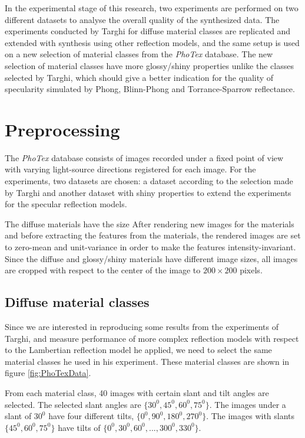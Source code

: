 \hypertarget{experiments}{
}

In the experimental stage of this research, two experiments are performed on two different datasets to analyse the overall quality of the synthesized data. The experiments conducted by Targhi for diffuse material classes are replicated and extended with synthesis using other reflection models, and the same setup is used on a new selection of material classes from the {\it PhoTex} database. The new selection of material classes have more glossy/shiny properties unlike the classes selected by Targhi, which should give a better indication for the quality of specularity simulated by Phong, Blinn-Phong and Torrance-Sparrow reflectance. 

\section{Preprocessing}\label{sec:preprocessing}
The {\it PhoTex} database consists of images recorded under a fixed point of view with varying light-source directions registered for each image. For the experiments, two datasets are chosen: a dataset according to the selection made by Targhi and another dataset with shiny properties to extend the experiments for the specular reflection models. 

The diffuse materials have the size After rendering new images for the materials and before extracting the features from the materials, the rendered images are set to zero-mean and unit-variance in order to make the features intensity-invariant. Since the diffuse and glossy/shiny materials have different image sizes, all images are cropped with respect to the center of the image to $200 \times 200$ pixels.

\subsection{Diffuse material classes}
Since we are interested in reproducing some results from the experiments of Targhi, and measure performance of more complex reflection models with respect to the Lambertian reflection model he applied, we need to select the same material classes he used in his experiment. These material classes are shown in figure \ref{fig:PhoTexData}.

From each material class, 40 images with certain slant and tilt angles are selected. The selected slant angles are $\{30^0, 45^0,60^0,75^0\}$. The images under a slant of $30^0$ have four different tilts, $\{0^0, 90^0, 180^0, 270^0\}$. The images with slants $\{45^0,60^0,75^0\}$ have tilts of $\{0^0,30^0,60^0,..., 300^0,330^0\}$. 

